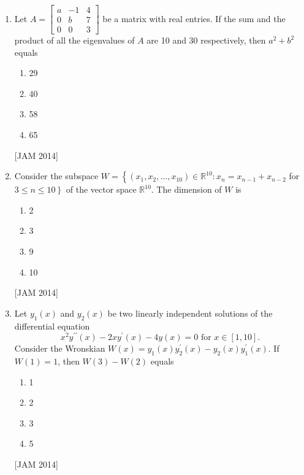 \begin{enumerate}
\begin{enumerate}
 \item $(2,2,0)$ 
\item $(0,3,2)$ 
\item $\quad(2,2,1)$ 
\item $(2,-1,-2)$
\end{enumerate}
\hfill [JAM 2014]



\item  Let $A=\left[\begin{array}{ccc}a & -1 & 4 \\ 0 & b & 7 \\ 0 & 0 & 3\end{array}\right]$ be a matrix with real entries. If the sum and the product of all the eigenvalues of $A$ are 10 and 30 respectively, then $a^{2}+b^{2}$ equals 


\begin{enumerate}
 \item 29 
\item 40 
\item 58 
\item 65
\end{enumerate}
\hfill [JAM 2014]



\item  Consider the subspace $W=\left\{\left(x_{1}, x_{2}, \ldots, x_{10}\right) \in \mathbb{R}^{10}: x_{n}=x_{n-1}+x_{n-2}\right.$ for $\left.3 \leq n \leq 10\right\}$ of the vector space $\mathbb{R}^{10}$. The dimension of $W$ is 

\begin{enumerate}
 
\item 2 
\item 3 
\item 9 
\item 10
\end{enumerate}
\hfill [JAM 2014]


\item  Let $y_{1}(x)$ and $y_{2}(x)$ be two linearly independent solutions of the differential equation
$$
x^{2} y^{\prime \prime}(x)-2 x y^{\prime}(x)-4 y(x)=0 \text { for } x \in[1,10] \text {. }
$$
Consider the Wronskian $W(x)=y_{1}(x) y_{2}^{\prime}(x)-y_{2}(x) y_{1}^{\prime}(x)$. If $W(1)=1$, then $W(3)-W(2)$ equals 


\begin{enumerate}
 
\item 1 
\item 2 
\item 3 
\item 5
\end{enumerate}
\hfill [JAM 2014]



\end{enumerate}
